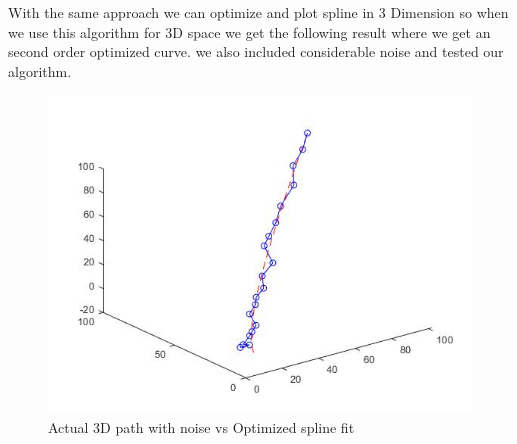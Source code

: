 With the same approach we can optimize and plot spline in 3 Dimension so when we use this algorithm for 3D space we get the following result where we get an second order optimized curve. we also included considerable noise and tested our algorithm.
  
\begin{figure}[!htb]
\includegraphics[width=\textwidth]{./figures/3DCurve.jpg}
\caption{Actual 3D path with noise vs Optimized spline fit}
\label{fig:errorc1}
\end{figure}
